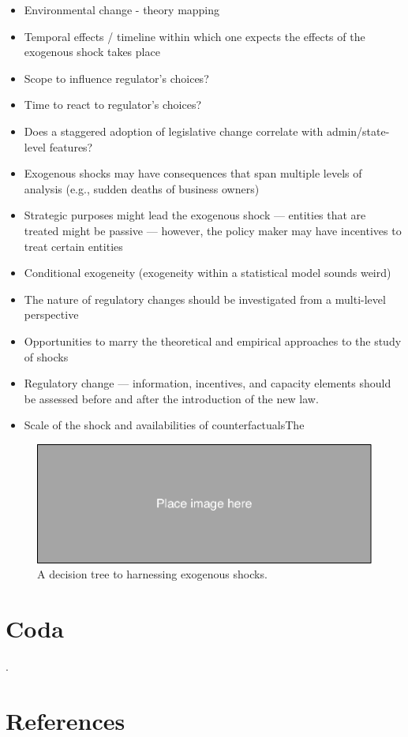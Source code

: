 \begin{refsection}
\begin{itemize}
\item Environmental change - theory mapping
\item Temporal effects / timeline within which one expects the effects of the exogenous shock takes place
\item Scope to influence regulator's choices?
\item Time to react to regulator's choices?
\item Does a staggered adoption of legislative change correlate with admin/state-level features?
\item Exogenous shocks may have consequences that span multiple levels of analysis (e.g., sudden deaths of business owners)
\item Strategic purposes might lead the exogenous shock — entities that are treated might be passive — however, the policy maker may have incentives to treat certain entities
\item Conditional exogeneity (exogeneity within a statistical model sounds weird)
\item The nature of regulatory changes should be investigated from a multi-level perspective
\item Opportunities to marry the theoretical and empirical approaches to the study of shocks
\item Regulatory change — information, incentives, and capacity elements should be assessed before and after the introduction of the new law.
\item Scale of the shock and availabilities of counterfactualsThe
\end{itemize}

\begin{figure}[!htbp]
  \includegraphics[width=1\textwidth]{exhibits/place_holder.pdf}
  \caption{A decision tree to harnessing exogenous shocks.}
  \label{fig:harnessing_exogeneous_shocks}
\end{figure}

\section{Coda}
\label{sec:coda}
.

\clearpage

%
\section*{References}
\printbibliography[heading=none]
\end{refsection}

